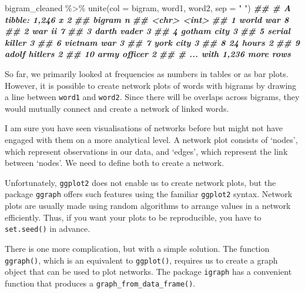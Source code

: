 \documentclass[
]{book}
\newenvironment{Shaded}{\begin{snugshade}}{\end{snugshade}}
\newcommand{\AttributeTok}[1]{\textcolor[rgb]{0.77,0.63,0.00}{#1}}
\newcommand{\DocumentationTok}[1]{\textcolor[rgb]{0.56,0.35,0.01}{\textbf{\textit{#1}}}}
\newcommand{\FunctionTok}[1]{\textcolor[rgb]{0.00,0.00,0.00}{#1}}
\newcommand{\NormalTok}[1]{#1}
\newcommand{\SpecialCharTok}[1]{\textcolor[rgb]{0.00,0.00,0.00}{#1}}
\newcommand{\StringTok}[1]{\textcolor[rgb]{0.31,0.60,0.02}{#1}}
\begin{document}
\begin{Shaded}
\begin{Highlighting}[]
\NormalTok{bigram\_cleaned }\SpecialCharTok{\%\textgreater{}\%}
  \FunctionTok{unite}\NormalTok{(}\AttributeTok{col =}\NormalTok{ bigram,}
\NormalTok{        word1, word2,}
        \AttributeTok{sep =} \StringTok{" "}\NormalTok{)}
\DocumentationTok{\#\# \# A tibble: 1,246 x 2}
\DocumentationTok{\#\#    bigram             n}
\DocumentationTok{\#\#    \textless{}chr\textgreater{}          \textless{}int\textgreater{}}
\DocumentationTok{\#\#  1 world war          8}
\DocumentationTok{\#\#  2 war ii             7}
\DocumentationTok{\#\#  3 darth vader        3}
\DocumentationTok{\#\#  4 gotham city        3}
\DocumentationTok{\#\#  5 serial killer      3}
\DocumentationTok{\#\#  6 vietnam war        3}
\DocumentationTok{\#\#  7 york city          3}
\DocumentationTok{\#\#  8 24 hours           2}
\DocumentationTok{\#\#  9 adolf hitler\textquotesingle{}s     2}
\DocumentationTok{\#\# 10 army officer       2}
\DocumentationTok{\#\# \# ... with 1,236 more rows}
\end{Highlighting}
\end{Shaded}

So far, we primarily looked at frequencies as numbers in tables or as bar plots. However, it is possible to create network plots of words with bigrams by drawing a line between \texttt{word1} and \texttt{word2}. Since there will be overlaps across bigrams, they would mutually connect and create a network of linked words.

I am sure you have seen visualisations of networks before but might not have engaged with them on a more analytical level. A network plot consists of `nodes', which represent observations in our data, and `edges', which represent the link between `nodes'. We need to define both to create a network.

Unfortunately, \texttt{ggplot2} does not enable us to create network plots, but the package \texttt{ggraph} offers such features using the familiar \texttt{ggplot2} syntax. Network plots are usually made using random algorithms to arrange values in a network efficiently. Thus, if you want your plots to be reproducible, you have to \texttt{set.seed()} in advance.

There is one more complication, but with a simple solution. The function \texttt{ggraph()}, which is an equivalent to \texttt{ggplot()}, requires us to create a graph object that can be used to plot networks. The package \texttt{igraph} has a convenient function that produces a \texttt{graph\_from\_data\_frame()}.
\end{document}
